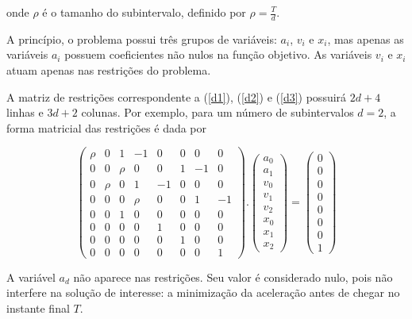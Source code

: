 \documentclass[10pt,oneside,a4paper]{article}
\begin{document}
\noindent
onde $\rho$ é o tamanho do subintervalo, definido por $\rho = \frac{T}{d}$.

A princípio, o problema possui três grupos de variáveis: $ a_i $, $ v_i $ e $ x_i $, mas apenas as variáveis $ a_i $ possuem coeficientes não nulos na função objetivo. As variáveis $ v_i $ e $ x_i $ atuam apenas nas restrições do problema.

A matriz de restrições correspondente a (\ref{d1}), (\ref{d2}) e (\ref{d3}) possuirá $ 2d+4 $ linhas e $ 3d+2 $ colunas. Por exemplo, para um número de subintervalos $ d=2 $, a forma matricial das restrições é dada por

\begin{equation}
\begin{pmatrix}
\rho & 0 & 1 & -1 & 0 & 0 & 0  & 0 \\
0 & 0 & \rho & 0 & 0 & 1 & -1 & 0 \\
0 & \rho & 0 & 1 & -1 & 0 & 0 & 0  \\
0 & 0 & 0 & \rho & 0 & 0 & 1 & -1 \\
0 & 0 & 1 & 0 & 0 & 0 & 0 & 0 \\
0 & 0 & 0 & 0 & 1 & 0 & 0 & 0 \\
0 & 0 & 0 & 0 & 0 & 1 & 0 & 0 \\
0 & 0 & 0 & 0 & 0 & 0 & 0 & 1
\end{pmatrix}
.
\begin{pmatrix}
a_0 \\
a_1 \\
v_0 \\
v_1 \\
v_2 \\
x_0 \\
x_1 \\
x_2 
\end{pmatrix}
=
\begin{pmatrix}
0 \\ 0 \\ 0 \\ 0 \\ 0 \\ 0 \\ 0 \\ 1
\end{pmatrix}
\label{matricial}
\end{equation}

A variável $ a_d $ não aparece nas restrições. Seu valor é considerado nulo, pois não interfere na solução de interesse: a minimização da aceleração antes de chegar no instante final $T$.
\end{document}
